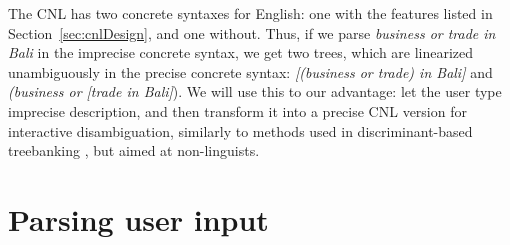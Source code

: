 \documentclass[11pt]{article}
\begin{document}
The CNL has two concrete syntaxes for English: one with the features listed in Section~\ref{sec:cnlDesign}, and one without.
Thus, if we parse \textit{business or trade in Bali} in the imprecise concrete syntax, we get two trees, which are linearized unambiguously in the precise concrete syntax: \textit{[(business or trade) in Bali]} and \textit{(business or [trade in Bali]}).
We will use this to our advantage: let the user type imprecise description, and then transform it into a precise CNL version for interactive disambiguation, similarly to methods used in discriminant-based treebanking \cite{carter1997treebanker}, but aimed at non-linguists.








\section{Parsing user input}
\label{sec:parsing}
\end{document}
